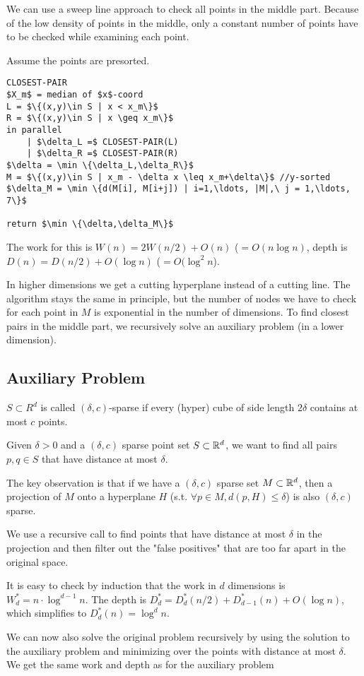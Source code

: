 We can use a sweep line approach to check all points in the middle part. Because of the low density of points in the middle, only a constant number of points have to be checked while examining each point.

Assume the points are presorted.

\begin{lstlisting}
CLOSEST-PAIR
$X_m$ = median of $x$-coord
L = $\{(x,y)\in S | x < x_m\}$
R = $\{(x,y)\in S | x \geq x_m\}$
in parallel
	| $\delta_L =$ CLOSEST-PAIR(L)
	| $\delta_R =$ CLOSEST-PAIR(R)
$\delta = \min \{\delta_L,\delta_R\}$
M = $\{(x,y)\in S | x_m - \delta x \leq x_m+\delta\}$ //y-sorted
$\delta_M = \min \{d(M[i], M[i+j]) | i=1,\ldots, |M|,\ j = 1,\ldots, 7\}$

return $\min \{\delta,\delta_M\}$
\end{lstlisting}

The work for this is $W(n) = 2W(n/2) + O(n)$ ($=O(n\log n)$, depth is $D(n) = D(n/2) + O(\log n)$ ($=O(\log ^2n$).

In higher dimensions we get a cutting hyperplane instead of a cutting line. The algorithm stays the same in principle, but the number of nodes we have to check for each point in $M$ is exponential in the number of dimensions. To find closest pairs in the middle part, we recursively solve an auxiliary problem (in a lower dimension).



\subsection{Auxiliary Problem}

\begin{Def} $S\subset R^d$ is called $(\delta, c)$-sparse if every (hyper) cube of side length $2\delta$ contains at most $c$ points.
\end{Def}

Given $\delta > 0$ and a $(\delta,c)$ sparse point set $S\subset \mathbb{R}^d$, we want to find all pairs $p,q\in S$ that have distance at most $\delta$.

The key observation is that if we have a $(\delta,c)$ sparse set $M\subset \mathbb{R}^d$, then a projection of $M$ onto a hyperplane $H$ (s.t. $\forall p\in M, d(p,H)\leq \delta$) is also $(\delta,c)$ sparse.

We use a recursive call to find points that have distance at most $\delta$ in the projection and then filter out the "false positives" that are too far apart in the original space.

It is easy to check by induction that the work in $d$ dimensions is $W_d^* = n\cdot \log^{d-1} n$. The depth is $D_d^* = D_d^*(n/2) + D_{d-1}^*(n) + O(\log n)$, which simplifies to $D_d^*(n) = \log^d n$.

We can now also solve the original problem recursively by using the solution to the auxiliary problem and minimizing over the points with distance at most $\delta$. We get the same work and depth as for the auxiliary problem